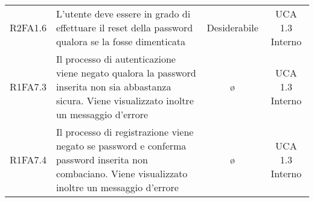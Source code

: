 {\begin{longtable}{ c C{4cm} c c}
R2FA1.6 & L'utente deve essere in grado di effettuare il reset della password qualora se la fosse dimenticata & Desiderabile & UCA 1.3 Interno\\

R1FA7.3 & Il processo di autenticazione viene negato qualora la password inserita non sia abbastanza sicura. Viene visualizzato inoltre un messaggio d'errore & \o & UCA 1.3 Interno\\

R1FA7.4 & Il processo di registrazione viene negato se password e conferma password inserita non combaciano. Viene visualizzato inoltre un messaggio d'errore & \o & UCA 1.3 Interno\\





\end{longtable}
}